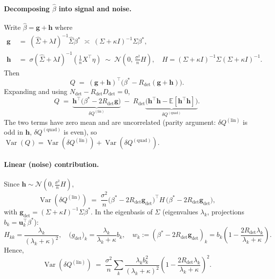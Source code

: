 \paragraph{Decomposing $\hat{\beta}$ into signal and noise.}

Write $\hat{\beta} = \mathbf{g} + \mathbf{h}$ where
\begin{align*}
  \mathbf{g} &\;=\; (\hat{\Sigma}+\lambda I)^{-1}\hat{\Sigma}\beta^{*}
  \;\asymp\;(\Sigma+\kappa I)^{-1}\Sigma\beta^{*},\\
  \mathbf{h} &\;=\; \sigma(\hat{\Sigma}+\lambda I)^{-1}\!\left(\tfrac{1}{n}X^{\top}\eta\right)
  \;\sim\;
  \mathcal{N}\!\left(0,\,\tfrac{\sigma^{2}}{n}H\right),
  \quad
  H = (\Sigma+\kappa I)^{-1}\Sigma(\Sigma+\kappa I)^{-1}.
\end{align*}
Then
\[
  Q \;=\; (\mathbf{g}+\mathbf{h})^{\top}\bigl(\beta^{*}-R_{\det}(\mathbf{g}+\mathbf{h})\bigr).
\]
Expanding and using $N_{\det}-R_{\det}D_{\det}=0$,
\begin{equation}
  Q
  \;=\;
  \underbrace{\mathbf{h}^{\top}\bigl(\beta^{*}-2R_{\det}\mathbf{g}\bigr)}_{\delta Q^{(\mathrm{lin})}}
  \;-\;
  R_{\det}\!\underbrace{\bigl(\mathbf{h}^{\top}\mathbf{h} - \mathbb{E}[\mathbf{h}^{\top}\mathbf{h}]\bigr)}_{\delta Q^{(\mathrm{quad})}}.
  \label{eq:Q_expand}
\end{equation}
The two terms have zero mean and are uncorrelated (parity argument:
$\delta Q^{(\mathrm{lin})}$ is odd in $\mathbf{h}$, $\delta Q^{(\mathrm{quad})}$
is even), so $\operatorname{Var}(Q)=\operatorname{Var}(\delta Q^{(\mathrm{lin})})+\operatorname{Var}(\delta Q^{(\mathrm{quad})})$.

\paragraph{Linear (noise) contribution.}

Since $\mathbf{h}\sim\mathcal{N}(0,\frac{\sigma^{2}}{n}H)$,
\[
  \operatorname{Var}(\delta Q^{(\mathrm{lin})})
  \;=\;
  \frac{\sigma^{2}}{n}
  \bigl(\beta^{*}-2R_{\det}\mathbf{g}_{\det}\bigr)^{\top}H\,
  \bigl(\beta^{*}-2R_{\det}\mathbf{g}_{\det}\bigr),
\]
with $\mathbf{g}_{\det}=(\Sigma+\kappa I)^{-1}\Sigma\beta^{*}$.
In the eigenbasis of $\Sigma$ (eigenvalues $\lambda_{k}$,
projections $b_{k}=\mathbf{u}_{k}^{\top}\beta^{*}$):
\[
  H_{kk} = \frac{\lambda_{k}}{(\lambda_{k}+\kappa)^{2}},
  \quad
  \bigl(g_{\det}\bigr)_{k} = \frac{\lambda_{k}}{\lambda_{k}+\kappa}b_{k},
  \quad
  w_{k} := \left(\beta^{*}-2R_{\det}\mathbf{g}_{\det}\right)_{k}
  = b_{k}\!\left(1 - \frac{2R_{\det}\lambda_{k}}{\lambda_{k}+\kappa}\right).
\]
Hence,
\begin{equation}
  \operatorname{Var}(\delta Q^{(\mathrm{lin})})
  \;=\;
  \frac{\sigma^{2}}{n}\sum_{k}\frac{\lambda_{k}b_{k}^{2}}{(\lambda_{k}+\kappa)^{2}}
  \!\left(1-\frac{2R_{\det}\lambda_{k}}{\lambda_{k}+\kappa}\right)^{\!2}.
  \label{eq:varQ_lin}
\end{equation}

